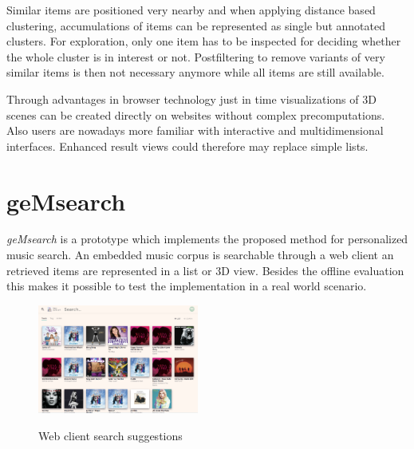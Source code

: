 \documentclass[a4paper]{llncs}
\begin{document}
	Similar items are positioned very nearby and when applying distance based clustering, accumulations of items can be represented as single but annotated clusters. For exploration, only one item has to be inspected for deciding whether the whole cluster is in interest or not. Postfiltering to remove variants of very similar items is then not necessary anymore while all items are still available.
	
	Through advantages in browser technology just in time visualizations of 3D scenes can be created directly on websites without complex precomputations. Also users are nowadays more familiar with interactive and multidimensional interfaces. Enhanced result views could therefore may replace simple lists.
	
	\section{geMsearch}
	\emph{geMsearch} is a prototype which implements the proposed method for personalized music search. An embedded music corpus is searchable through a web client an retrieved items are represented in a list or 3D view. Besides the offline evaluation this makes it possible to test the implementation in a real world scenario. 
	
	
	
	\begin{figure}[ht]
		{\includegraphics[width=200px]{web_client.png}}	
		\caption{Web client search suggestions}
		\label{fig:web_client}
	\end{figure}
		
\end{document}

